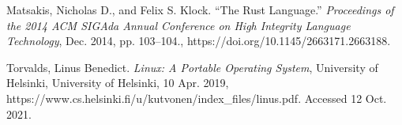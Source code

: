 \documentclass[12pt]{article}
\newcommand{\bibent}{\noindent \hangindent 40pt}
\newenvironment{workscited}{}{\newpage }
\begin{document}
\begin{flushleft}
\begin{workscited}
				\bibent
				Matsakis, Nicholas D., and Felix S. Klock. “The Rust Language.” \textit{Proceedings of the 2014 ACM
				SIGAda Annual Conference on High Integrity Language Technology}, Dec. 2014, pp. 
				103–104., https://doi.org/10.1145/2663171.2663188. 
				
				\bibent
				Torvalds, Linus Benedict. \textit{Linux: A Portable Operating System}, University of Helsinki,
				University of Helsinki, 10 Apr. 2019,
				https://www.cs.helsinki.fi/u/kutvonen/index\_files/linus.pdf.
				Accessed 12 Oct. 2021.
				
			\end{workscited}
			
		\end{flushleft}
	
\end{document}
